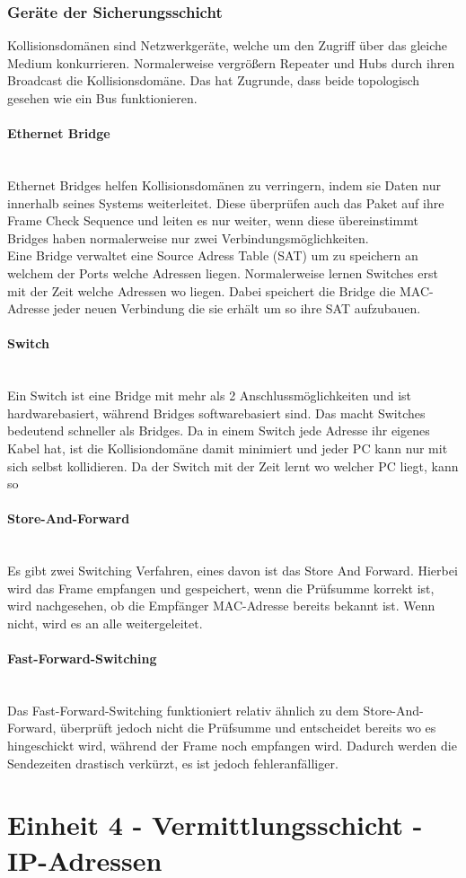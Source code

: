 \documentclass{article}
\newcommand{\paragraphlb}[1]{\paragraph{#1}\mbox{}\\}
\begin{document}
	 \subsubsection{Geräte der Sicherungsschicht}
	 Kollisionsdomänen sind Netzwerkgeräte, welche um den Zugriff über das gleiche Medium konkurrieren. Normalerweise vergrößern Repeater und Hubs durch ihren Broadcast die Kollisionsdomäne. Das hat Zugrunde, dass beide topologisch gesehen wie ein Bus funktionieren.
	 \paragraphlb{Ethernet Bridge}
	 Ethernet Bridges helfen Kollisionsdomänen zu verringern, indem sie Daten nur innerhalb seines Systems weiterleitet. Diese überprüfen auch das Paket auf ihre Frame Check Sequence und leiten es nur weiter, wenn diese übereinstimmt Bridges haben normalerweise nur zwei Verbindungsmöglichkeiten. \\
	 Eine Bridge verwaltet eine Source Adress Table (SAT) um zu speichern an welchem der Ports welche Adressen liegen. Normalerweise lernen Switches erst mit der Zeit welche Adressen wo liegen. Dabei speichert die Bridge die MAC-Adresse jeder neuen Verbindung die sie erhält um so ihre SAT aufzubauen.
	 \paragraphlb{Switch}
	 Ein Switch ist eine Bridge mit mehr als 2 Anschlussmöglichkeiten und ist hardwarebasiert, während Bridges softwarebasiert sind. Das macht Switches bedeutend schneller als Bridges. Da in einem Switch jede Adresse ihr eigenes Kabel hat, ist die Kollisiondomäne damit minimiert und jeder PC kann nur mit sich selbst kollidieren. Da der Switch mit der Zeit lernt wo welcher PC liegt, kann so
	 \paragraphlb{Store-And-Forward}
	 Es gibt zwei Switching Verfahren, eines davon ist das Store And Forward. Hierbei wird das Frame empfangen und gespeichert, wenn die Prüfsumme korrekt ist, wird nachgesehen, ob die Empfänger MAC-Adresse bereits bekannt ist. Wenn nicht, wird es an alle weitergeleitet. 
	 \paragraphlb{Fast-Forward-Switching}
	 Das Fast-Forward-Switching funktioniert relativ ähnlich zu dem Store-And-Forward, überprüft jedoch nicht die Prüfsumme und entscheidet bereits wo es hingeschickt wird, während der Frame noch empfangen wird. Dadurch werden die Sendezeiten drastisch verkürzt, es ist jedoch fehleranfälliger.
	 \section{Einheit 4 - Vermittlungsschicht - IP-Adressen}
\end{document}
